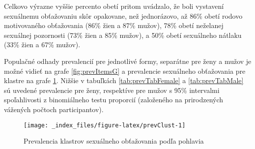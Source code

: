 \documentclass[
]{article}
\begin{document}
Celkovo výrazne vyššie percento obetí pritom uvádzalo, že boli vystavení sexuálnemu obťažovaniu skôr opakovane, než jednorázovo, až 86\% obetí rodovo motivovaného obťažovania (86\% žien a 87\% mužov), 78\% obetí neželanej sexuálnej pozornosti (73\% žien a 85\% mužov), a 50\% obetí sexuálneho nátlaku (33\% žien a 67\% mužov).

Populačné odhady prevalencií pre jednotlivé formy, separátne pre ženy a mužov je možné vidieť na grafe \ref{fig:prevItemsG} a prevalencie sexuálneho obťažovania pre klastre na grafe \ref{fig:prevClust}. Nižšie v tabuľkách \ref{tab:prevTabFemale} a \ref{tab:prevTabMale} sú uvedené prevalencie pre ženy, respektíve pre mužov s 95\% intervalmi spoľahlivosti z binomiálneho testu proporcií (založeného na prirodzených vážených počtoch participantov).

\begin{figure}

{\centering \texttt{[image: \_index\_files/figure-latex/prevClust-1]} 

}

\caption{Prevalencia klastrov sexuálneho obťažovania podľa pohlavia}\label{fig:prevClust}
\end{figure}
\end{document}
